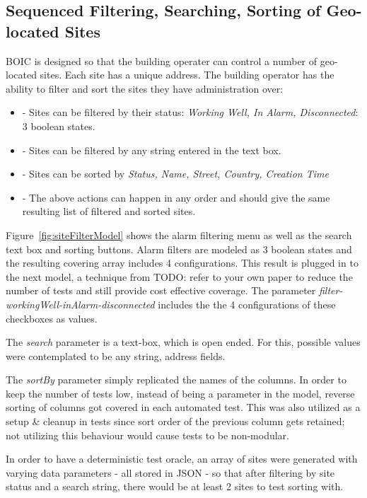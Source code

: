 \documentclass[conference]{IEEEtran}
\newcommand{\todo}[1]{}
\renewcommand{\todo}[1]{{\color{red} TODO: {#1}}}
\begin{document}
	

	\subsection{Sequenced Filtering, Searching, Sorting of Geo-located Sites}

	BOIC is designed so that the building operater can control a number of geo-located sites. 
	Each site has a unique address. The building operator has the ability to filter and sort the sites they have administration over:

	\begin{itemize}
		\item [] - Sites can be filtered by their status: \textit{Working Well, In Alarm, Disconnected}: 3 boolean states.
		\item [] - Sites can be filtered by any string entered in the text box.
		\item [] - Sites can be sorted by \textit{Status, Name, Street, Country, Creation Time}
		\item [] - The above actions can happen in any order and should give the same resulting list of filtered and sorted sites.
	\end{itemize}

	Figure~\ref{fig:siteFilterModel} shows the alarm filtering menu as well as the search text box and sorting buttons. 
	Alarm filters are modeled as 3 boolean states and the resulting covering array includes 4 configurations. 
	This result is plugged in to the next model, a technique from \todo{refer to your own paper} to reduce the number of tests and still provide cost effective coverage.
	The parameter \textit{filter-workingWell-inAlarm-disconnected} includes the the 4 configurations of these checkboxes as values. 

	The \textit{search} parameter is a text-box, which is open ended. For this, possible values were contemplated to be any string, address fields.

	The \textit{sortBy} parameter simply replicated the names of the columns. 
	In order to keep the number of tests low, instead of being a parameter in the model, reverse sorting of columns got covered in each automated test.
	This was also utilized as a setup \& cleanup in tests since sort order of the previous column gets retained; not utilizing this behaviour would cause tests to be non-modular.

	In order to have a deterministic test oracle, an array of sites were generated with varying data parameters - all stored in JSON - so that after filtering by site status and a search string, there would be at least 2 sites to test sorting with.
	
\end{document}
